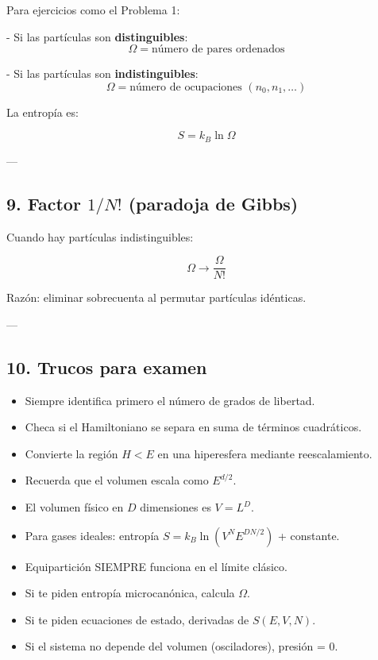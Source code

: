 \documentclass{article}
\begin{document}
Para ejercicios como el Problema 1:

- Si las partículas son \textbf{distinguibles}:  
  \[
  \Omega = \text{número de pares ordenados}
  \]

- Si las partículas son \textbf{indistinguibles}:  
  \[
  \Omega = \text{número de ocupaciones } (n_{0},n_{1},\ldots)
  \]

La entropía es:

\[
S = k_{B}\ln \Omega
\]

---

\subsection*{\textcolor{Apple Green}{9. Factor \(1/N!\) (paradoja de Gibbs)}}

Cuando hay partículas indistinguibles:

\[
\boxed{
\Omega \rightarrow \frac{\Omega}{N!}
}
\]

Razón: eliminar sobrecuenta al permutar partículas idénticas.

---

\subsection*{\textcolor{Apple Green}{10. Trucos para examen}}

\begin{itemize}
  \item Siempre identifica primero el número de grados de libertad.  
  \item Checa si el Hamiltoniano se separa en suma de términos cuadráticos.  
  \item Convierte la región \(H<E\) en una hiperesfera mediante reescalamiento.  
  \item Recuerda que el volumen escala como \(E^{d/2}\).  
  \item El volumen físico en \(D\) dimensiones es \(V = L^{D}\).  
  \item Para gases ideales: entropía \(S = k_{B}\ln(V^{N}E^{DN/2})\) + constante.  
  \item Equipartición SIEMPRE funciona en el límite clásico.  
  \item Si te piden entropía microcanónica, calcula \(\Omega\).  
  \item Si te piden ecuaciones de estado, derivadas de \(S(E,V,N)\).  
  \item Si el sistema no depende del volumen (osciladores), presión = 0.  
\end{itemize}
\end{document}

